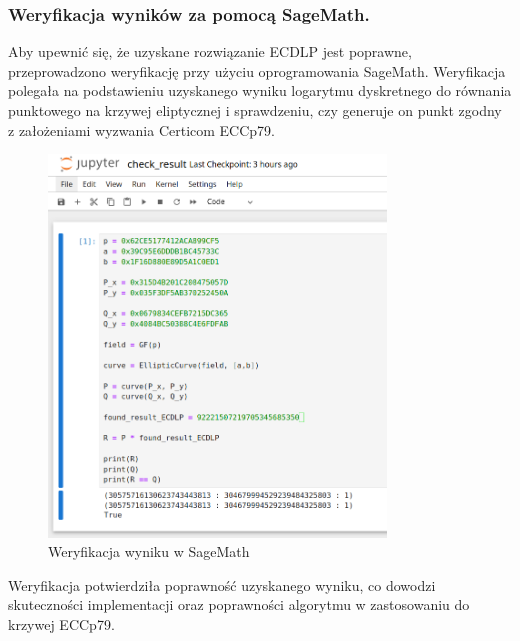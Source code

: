 \subsubsection{Weryfikacja wyników za pomocą SageMath.}
Aby upewnić się, że uzyskane rozwiązanie ECDLP jest poprawne, przeprowadzono
weryfikację przy użyciu oprogramowania SageMath. Weryfikacja polegała na
podstawieniu uzyskanego wyniku logarytmu dyskretnego do równania punktowego
na krzywej eliptycznej i sprawdzeniu, czy generuje on punkt
zgodny z założeniami wyzwania Certicom ECCp79.
\begin{figure}[H]
    \centering
    \includegraphics[width=0.8\textwidth]{img/sage_verify_white.png}
    \caption{Weryfikacja wyniku w SageMath}
    \label{fig:sage_verification}
\end{figure}

Weryfikacja potwierdziła poprawność uzyskanego wyniku, co dowodzi skuteczności
implementacji oraz poprawności algorytmu w zastosowaniu do krzywej ECCp79.

